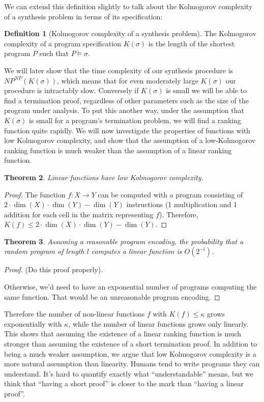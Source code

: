 \documentclass[preprint]{sigplanconf}
\newtheorem{theorem}{Theorem}
\theoremstyle{definition}
\newtheorem{definition}[theorem]{Definition}
\begin{document}
We can extend this definition slightly to talk about the Kolmogorov complexity of a
synthesis problem in terms of its specification:

\begin{definition}[Kolmogorov complexity of a synthesis problem]
 The Kolmogorov complexity of a program specification $K(\sigma)$ is the length of the shortest
 program $P$ such that $P \models \sigma$.
\end{definition}

We will later show that the time complexity of our synthesis procedure is $NP^{NP}(K(\sigma))$,
which means that for even moderately large $K(\sigma)$ our procedure is intractably slow.  Conversely
if $K(\sigma)$ is small we will be able to find a termination proof, regardless of other parameters
such as the size of the program under analysis.  To put this another way, under the assumption
that $K(\sigma)$ is small for a program's termination problem, we will find a ranking function
quite rapidly.  We will now investigate the properties of functions with low Kolmogorov complexity,
and show that the assumption of a low-Kolmogorov ranking function is much weaker than the assumption
of a linear ranking function.


\begin{theorem}
 Linear functions have low Kolmogorov complexity.
\end{theorem}

\begin{proof}
 The function $f: X \to Y$ can be computed with a program consisting of
 $2 \cdot \dim(X) \cdot \dim(Y) - \dim(Y)$ instructions (1 multiplication and 1 addition for
 each cell in the matrix representing $f$).  Therefore,
 $K(f) \leq 2 \cdot \dim(X) \cdot \dim(Y) - \dim(Y)$.
\end{proof}

\begin{theorem}
Assuming a reasonable program encoding, the probability that a random program of length $l$ computes
a linear function is $O(2^{-l})$.
\end{theorem}

\begin{proof}
 (Do this proof properly).
 
 Otherwise, we'd need to have an exponential number of programs computing the same function.
 That would be an unreasonable program encoding.
\end{proof}


Therefore the number of non-linear functions $f$ with $K(f) \leq \kappa$
grows exponentially with $\kappa$, while the number of linear functions
grows only linearly.  This shows that assuming the existence of a linear
ranking function is much stronger than assuming the existence of a short
termination proof.  In addition to being a much weaker assumption,
we argue that low Kolmogorov complexity is a more natural assumption than
linearity.  Humans tend to write programs they can understand.  It's hard
to quantify exactly what ``understandable'' means, but we think that
``having a short proof'' is closer to the mark than ``having a linear proof''.
\end{document}
